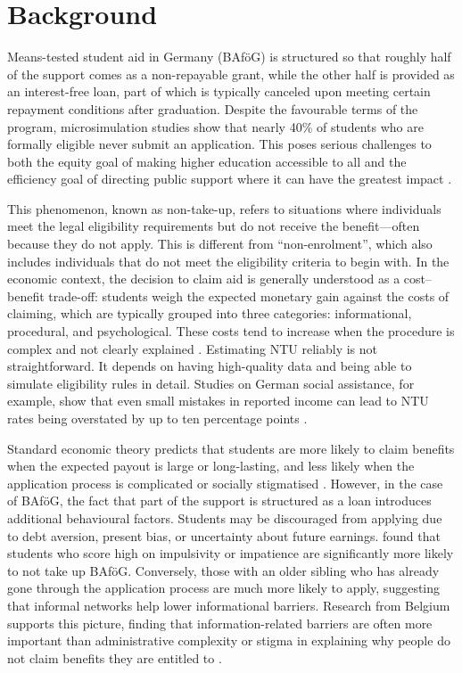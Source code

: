 \section{Background}
\label{section:theoretical_empirical_context}
Means-tested student aid in Germany (BAföG) is structured so that roughly half of the support comes as a non-repayable grant, while the other half is provided as an interest-free loan, part of which is typically canceled upon meeting certain repayment conditions after graduation. 
Despite the favourable terms of the program, microsimulation studies show that nearly 40\% of students who are formally eligible never submit an application. 
This poses serious challenges to both the equity goal of making higher education accessible to all and the efficiency goal of directing public support where it can have the greatest impact \citep{herber_non-take-up_2019}.

This phenomenon, known as non-take-up, refers to situations where individuals meet the legal eligibility requirements but do not receive the benefit—often because they do not apply.
This is different from “non-enrolment”, which also includes individuals that do not meet the eligibility criteria to begin with.
In the economic context, the decision to claim aid is generally understood as a cost–benefit trade-off: students weigh the expected monetary gain against the costs of claiming, which are typically grouped into three categories: informational, procedural, and psychological. 
These costs tend to increase when the procedure is complex and not clearly explained \citep{booij_role_2012}. Estimating NTU reliably is not straightforward. It depends on having high-quality data and being able to simulate eligibility rules in detail. Studies on German social assistance, for example, show that even small mistakes in reported income can lead to NTU rates being overstated by up to ten percentage points \citep{frick_claim_2007}.

Standard economic theory predicts that students are more likely to claim benefits when the expected payout is large or long-lasting, and less likely when the application process is complicated or socially stigmatised \citep{booij_role_2012}. However, in the case of BAföG, the fact that part of the support is structured as a loan introduces additional behavioural factors. Students may be discouraged from applying due to debt aversion, present bias, or uncertainty about future earnings. \cite{herber_non-take-up_2019} found that students who score high on impulsivity or impatience are significantly more likely to not take up BAföG. Conversely, those with an older sibling who has already gone through the application process are much more likely to apply, suggesting that informal networks help lower informational barriers. Research from Belgium supports this picture, finding that information-related barriers are often more important than administrative complexity or stigma in explaining why people do not claim benefits they are entitled to \citep{fidan_why_2021, herber_non-take-up_2019, bolland_information_nodate}.

